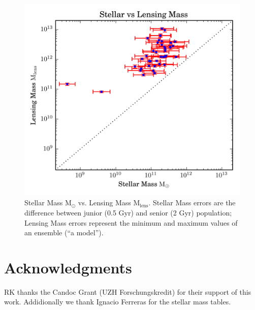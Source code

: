 \documentclass{ws-procs975x65}
\newcommand{\Mlens}{\ensuremath{\text{M}_\text{lens}}\xspace}
\newcommand{\Mstel}{\ensuremath{\text{M}_\odot}\xspace}
\begin{document}
\begin{figure}
  \centering
  \includegraphics[width=0.8\columnwidth]{img/plot}
  \caption{Stellar Mass \Mstel vs. Lensing Mass \Mlens. Stellar Mass errors are the difference between junior (0.5 Gyr) and senior (2 Gyr) population; Lensing Mass errors represent the minimum and maximum values of an ensemble (``a model'').}
  \label{fig:frac}
\end{figure}


\section*{Acknowledgments}
RK thanks the Candoc Grant (UZH Forschungskredit) for their support of this work.
Addidionally we thank Ignacio Ferreras for the stellar mass tables.



\end{document}
